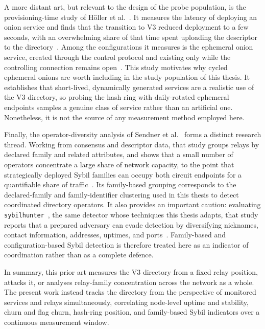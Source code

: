 \documentclass[conference]{IEEEtran}
\begin{document}
A more distant art, but relevant to the design of the probe population, is the provisioning-time study of H\"oller et al.~\cite{hoeller2021shortlived}. It measures the latency of deploying an onion service and finds that the transition to V3 reduced deployment to a few seconds, with an overwhelming share of 
that time spent uploading the descriptor to the directory~\cite{hoeller2021shortlived}. Among the configurations it measures is the ephemeral onion service, created through the control protocol and existing only while the controlling connection remains open~\cite{hoeller2021shortlived}. This study motivates why 
cycled ephemeral onions are worth including in the study population of this thesis. It establishes that short-lived, dynamically generated services are a realistic use of the V3 directory, so probing the hash ring with daily-rotated ephemeral endpoints samples a genuine class of service rather than an artificial 
one. Nonetheless, it is not the source of any measurement method employed here.

Finally, the operator-diversity analysis of Sendner et al.~\cite{sendner2025sybil} forms a distinct research thread. Working from consensus and descriptor data, that study groups relays by declared family and related attributes, and shows that a small number of operators concentrate a large share of network capacity,
to the point that strategically deployed Sybil families can occupy both circuit endpoints for a quantifiable share of traffic~\cite{sendner2025sybil}. Its family-based grouping corresponds to the declared-family and family-identifier clustering used in this thesis to detect coordinated directory operators. It also 
provides an important caution: evaluating \texttt{sybilhunter}~\cite{winter2016sybil}, the same detector whose techniques this thesis adapts, that study reports that a prepared adversary can evade detection by diversifying nicknames, contact information, addresses, uptimes, and ports~\cite{sendner2025sybil}. Family-based 
and configuration-based Sybil detection is therefore treated here as an indicator of coordination rather than as a complete defence.
 
In summary, this prior art measures the V3 directory from a fixed relay position, attacks it, or analyses relay-family concentration across the network as a whole. The present work instead tracks the directory from the perspective of monitored services and relays simultaneously, correlating node-level uptime and 
stability, churn and flag churn, hash-ring position, and family-based Sybil indicators over a continuous measurement window. %
\end{document}
